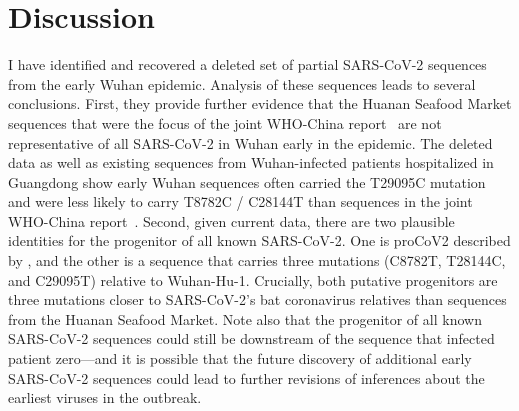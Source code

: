 \documentclass[9pt,twocolumn,twoside]{gsajnl_modified}
\begin{document}
\section{Discussion}
I have identified and recovered a deleted set of partial SARS-CoV-2 sequences from the early Wuhan epidemic.
Analysis of these sequences leads to several conclusions.
First, they provide further evidence that the Huanan Seafood Market sequences that were the focus of the joint WHO-China report~\citep{WHO2021origins} are not representative of all SARS-CoV-2 in Wuhan early in the epidemic.
The deleted data as well as existing sequences from Wuhan-infected patients hospitalized in Guangdong show early Wuhan sequences often carried the T29095C mutation and were less likely to carry T8782C / C28144T than sequences in the joint WHO-China report~\citep{WHO2021origins}.
Second, given current data, there are two plausible identities for the progenitor of all known SARS-CoV-2.
One is proCoV2 described by \citet{kumar2021evolutionary}, and the other is a sequence that carries three mutations (C8782T, T28144C, and C29095T) relative to Wuhan-Hu-1.
Crucially, both putative progenitors are three mutations closer to SARS-CoV-2's bat coronavirus relatives than sequences from the Huanan Seafood Market.
Note also that the progenitor of all known SARS-CoV-2 sequences could still be downstream of the sequence that infected patient zero---and it is possible that the future discovery of additional early SARS-CoV-2 sequences could lead to further revisions of inferences about the earliest viruses in the outbreak.
\end{document}
